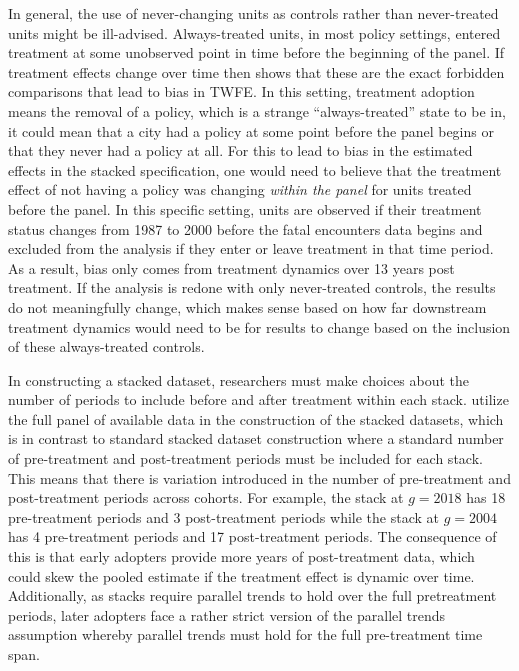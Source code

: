 \documentclass[12pt]{article}
\begin{document}
In general, the use of never-changing units as controls rather than never-treated units might be ill-advised. Always-treated units, in most policy settings, entered treatment at some unobserved point in time before the beginning of the panel. If treatment effects change over time then \textcite{goodman2021difference} shows that these are the exact forbidden comparisons that lead to bias in TWFE. In this setting, treatment adoption means the removal of a policy, which is a strange ``always-treated'' state to be in, it could mean that a city had a policy at some point before the panel begins or that they never had a policy at all. For this to lead to bias in the estimated effects in the stacked specification, one would need to believe that the treatment effect of not having a policy was changing \textit{within the panel} for units treated before the panel. In this specific setting, units are observed if their treatment status changes from 1987 to 2000 before the fatal encounters data begins and excluded from the analysis if they enter or leave treatment in that time period. As a result, bias only comes from treatment dynamics over 13 years post treatment. If the analysis is redone with only never-treated controls, the results do not meaningfully change, which makes sense based on how far downstream treatment dynamics would need to be for results to change based on the inclusion of these always-treated controls.


In constructing a stacked dataset, researchers must make choices about the number of periods to include before and after treatment within each stack. \textcite{payson2025residency} utilize the full panel of available data in the construction of the stacked datasets, which is in contrast to standard stacked dataset construction \parencite{cengiz2019effect, baker2022much, wing2024stacked} where a standard number of pre-treatment and post-treatment periods must be included for each stack. This means that there is variation introduced in the number of pre-treatment and post-treatment periods across cohorts. For example, the stack at $g = 2018$ has 18 pre-treatment periods and 3 post-treatment periods while the stack at $g = 2004$ has 4 pre-treatment periods and 17 post-treatment periods. The consequence of this is that early adopters provide more years of post-treatment data, which could skew the pooled estimate if the treatment effect is dynamic over time. Additionally, as stacks require parallel trends to hold over the full pretreatment periods, later adopters face a rather strict version of the parallel trends assumption whereby parallel trends must hold for the full pre-treatment time span.
\end{document}

